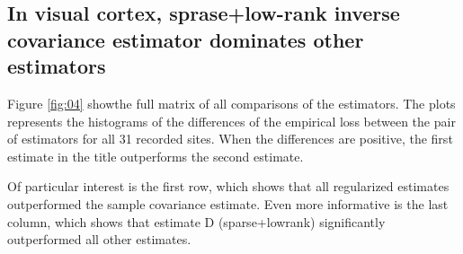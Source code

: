 \subsection*{In visual cortex, sprase+low-rank inverse covariance estimator dominates other estimators}

Figure \ref{fig:04} showthe full matrix of all comparisons of the estimators.  The plots represents the histograms of the differences of the empirical loss between the pair of estimators for all 31 recorded sites.  When the differences are positive, the first estimate in the title outperforms the second estimate.

Of particular interest is the first row, which shows that all regularized estimates  outperformed the sample covariance estimate.  Even more informative is the last column, which shows that estimate D (sparse+lowrank) significantly outperformed all other estimates.
